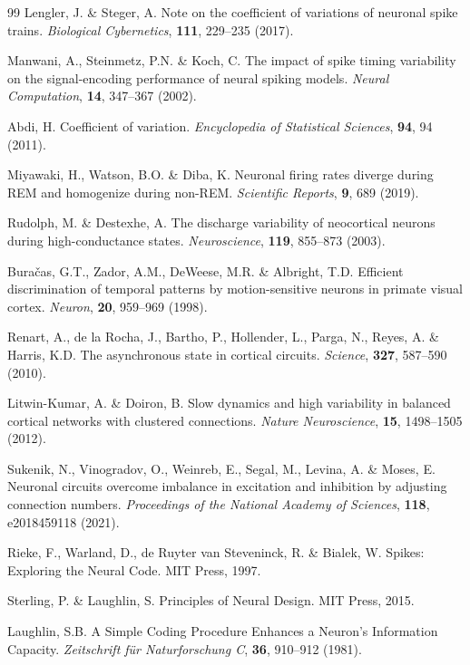 \begin{thebibliography}{99}
 Lengler, J. \& Steger, A. Note on the coefficient of variations of neuronal spike trains. \emph{Biological Cybernetics}, \textbf{111}, 229--235 (2017).

 Manwani, A., Steinmetz, P.N. \& Koch, C. The impact of spike timing variability on the signal-encoding performance of neural spiking models. \emph{Neural Computation}, \textbf{14}, 347--367 (2002).

 Abdi, H. Coefficient of variation. \emph{Encyclopedia of Statistical Sciences}, \textbf{94}, 94 (2011).

 Miyawaki, H., Watson, B.O. \& Diba, K. Neuronal firing rates diverge during REM and homogenize during non-REM. \emph{Scientific Reports}, \textbf{9}, 689 (2019).

 Rudolph, M. \& Destexhe, A. The discharge variability of neocortical neurons during high-conductance states. \emph{Neuroscience}, \textbf{119}, 855--873 (2003).

 Bura{\v c}as, G.T., Zador, A.M., DeWeese, M.R. \& Albright, T.D. Efficient discrimination of temporal patterns by motion-sensitive neurons in primate visual cortex. \emph{Neuron}, \textbf{20}, 959--969 (1998).

 Renart, A., de la Rocha, J., Bartho, P., Hollender, L., Parga, N., Reyes, A. \& Harris, K.D. The asynchronous state in cortical circuits. \emph{Science}, \textbf{327}, 587--590 (2010).

 Litwin-Kumar, A. \& Doiron, B. Slow dynamics and high variability in balanced cortical networks with clustered connections. \emph{Nature Neuroscience}, \textbf{15}, 1498--1505 (2012).

 Sukenik, N., Vinogradov, O., Weinreb, E., Segal, M., Levina, A. \& Moses, E. Neuronal circuits overcome imbalance in excitation and inhibition by adjusting connection numbers. \emph{Proceedings of the National Academy of Sciences}, \textbf{118}, e2018459118 (2021).

 Rieke, F., Warland, D., de Ruyter van Steveninck, R. \& Bialek, W. Spikes: Exploring the Neural Code. MIT Press, 1997.

 Sterling, P. \& Laughlin, S. Principles of Neural Design. MIT Press, 2015.

 Laughlin, S.B. A Simple Coding Procedure Enhances a Neuron's Information Capacity. \emph{Zeitschrift für Naturforschung C}, \textbf{36}, 910--912 (1981).


\end{thebibliography}
